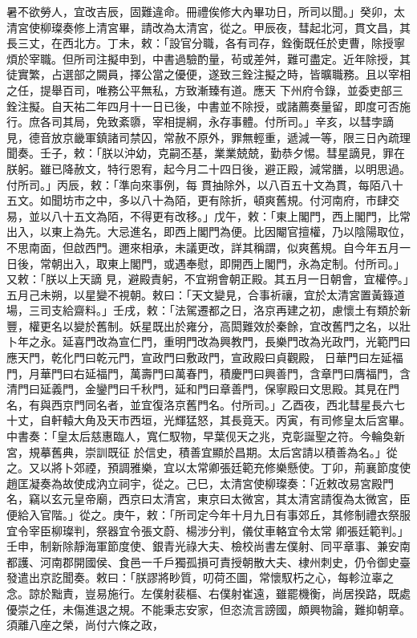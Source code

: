 \begin{pinyinscope}
 暑不欲勞人，宜改吉辰，固難違命。冊禮俟修大內畢功日，所司以聞。」癸卯，太清宮使柳璨奏修上清宮畢，請改為太清宮，從之。甲辰夜，彗起北河，貫文昌，其長三丈，在西北方。丁未，敕：「設官分職，各有司存，銓衡既任於吏曹，除授寧煩於宰職。但所司注擬申到，中書過驗酌量，茍或差舛，難可盡定。近年除授，其徒實繁，占選部之闕員，擇公當之優便，遂致三銓注擬之時，皆曠職務。且以宰相之任，提舉百司，唯務公平無私，方致漸臻有道。應天
 下州府令錄，並委吏部三銓注擬。自天祐二年四月十一日已後，中書並不除授，或諸薦奏量留，即度可否施行。庶各司其局，免致紊隳，宰相提綱，永存事體。付所司。」辛亥，以彗孛謫見，德音放京畿軍鎮諸司禁囚，常赦不原外，罪無輕重，遞減一等，限三日內疏理聞奏。壬子，敕：「朕以沖幼，克嗣丕基，業業兢兢，勤恭夕惕。彗星謫見，罪在朕躬。雖已降赦文，特行恩宥，起今月二十四日後，避正殿，減常膳，以明思過。付所司。」丙辰，敕：「準向來事例，每
 貫抽除外，以八百五十文為貫，每陌八十五文。如聞坊市之中，多以八十為陌，更有除折，頓爽舊規。付河南府，市肆交易，並以八十五文為陌，不得更有改移。」戊午，敕：「東上閣門，西上閣門，比常出入，以東上為先。大忌進名，即西上閣門為便。比因閹官擅權，乃以陰陽取位，不思南面，但啟西門。邇來相承，未議更改，詳其稱謂，似爽舊規。自今年五月一日後，常朝出入，取東上閣門，或遇奉慰，即開西上閣門，永為定制。付所司。」又敕：「朕以上天謫
 見，避殿責躬，不宜朔會朝正殿。其五月一日朝會，宜權停。」五月己未朔，以星變不視朝。敕曰：「天文變見，合事祈禳，宜於太清宮置黃籙道場，三司支給齋料。」壬戌，敕：「法駕遷都之日，洛京再建之初，慮懷土有類於新豐，權更名以變於舊制。妖星既出於雍分，高閎難效於秦餘，宜改舊門之名，以壯卜年之永。延喜門改為宣仁門，重明門改為興教門，長樂門改為光政門，光範門曰應天門，乾化門曰乾元門，宣政門曰敷政門，宣政殿曰貞觀殿，
 日華門曰左延福門，月華門曰右延福門，萬壽門曰萬春門，積慶門曰興善門，含章門曰膺福門，含清門曰延義門，金鑾門曰千秋門，延和門曰章善門，保寧殿曰文思殿。其見在門名，有與西京門同名者，並宜復洛京舊門名。付所司。」乙酉夜，西北彗星長六七十丈，自軒轅大角及天市西垣，光輝猛怒，其長竟天。丙寅，有司修皇太后宮畢。中書奏：「皇太后慈惠臨人，寬仁馭物，早葉伣天之兆，克彰誕聖之符。今輪奐新宮，規摹舊典，崇訓既征
 於信史，積善宜顯於昌期。太后宮請以積善為名。」從之。又以將卜郊禋，預調雅樂，宜以太常卿張廷範充修樂懸使。丁卯，荊襄節度使趙匡凝奏為故使成汭立祠宇，從之。己巳，太清宮使柳璨奏：「近敕改易宮殿門名，竊以玄元皇帝廟，西京曰太清宮，東京曰太微宮，其太清宮請復為太微宮，臣便給入官階。」從之。庚午，敕：「所司定今年十月九日有事郊丘，其修制禮衣祭服宜令宰臣柳璨判，祭器宜令張文蔚、楊涉分判，儀仗車輅宜令太常
 卿張廷範判。」壬申，制新除靜海軍節度使、銀青光祿大夫、檢校尚書左僕射、同平章事、兼安南都護、河南郡開國侯、食邑一千戶獨孤損可責授朝散大夫、棣州刺史，仍令御史臺發遣出京訖聞奏。敕曰：「朕謬將眇質，叨荷丕圖，常懷馭朽之心，每軫泣辜之念。諒於黜責，豈易施行。左僕射裴樞、右僕射崔遠，雖罷機衡，尚居揆路，既處優崇之任，未傷進退之規。不能秉志安家，但恣流言謗國，頗興物論，難抑朝章。須離八座之榮，尚付六條之政，

\end{pinyinscope}
